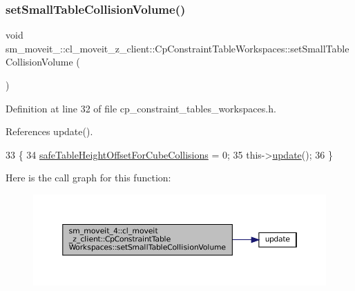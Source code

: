 \subsubsection{\texorpdfstring{set\+Small\+Table\+Collision\+Volume()}{setSmallTableCollisionVolume()}}
{\footnotesize\ttfamily void sm\+\_\+moveit\+\_\+::cl\+\_\+moveit\+\_\+z\+\_\+client\+::\+Cp\+Constraint\+Table\+Workspaces\+::set\+Small\+Table\+Collision\+Volume (\begin{DoxyParamCaption}{ }\end{DoxyParamCaption})\hspace{0.3cm}{\ttfamily [inline]}}



Definition at line 32 of file cp\+\_\+constraint\+\_\+tables\+\_\+workspaces.\+h.



References update().


\begin{DoxyCode}
33             \{
34                 \hyperlink{classsm__moveit__4_1_1cl__moveit__z__client_1_1CpConstraintTableWorkspaces_a8c9bd78c8330ae1446e5bc4d2891e285}{safeTableHeightOffsetForCubeCollisions} = 0;
35                 this->\hyperlink{classsm__moveit__4_1_1cl__moveit__z__client_1_1CpConstraintTableWorkspaces_ae0b53f2cceedd97e053e66b1df2d9486}{update}();
36             \}
\end{DoxyCode}
Here is the call graph for this function\+:
\nopagebreak
\begin{figure}[H]
\begin{center}
\leavevmode
\includegraphics[width=350pt]{classsm__moveit__4_1_1cl__moveit__z__client_1_1CpConstraintTableWorkspaces_a8652bbff65de57c74d8ce4da01ea2484_cgraph}
\end{center}
\end{figure}
\mbox{\label{classsm__moveit__4_1_1cl__moveit__z__client_1_1CpConstraintTableWorkspaces_ae0b53f2cceedd97e053e66b1df2d9486}} 
